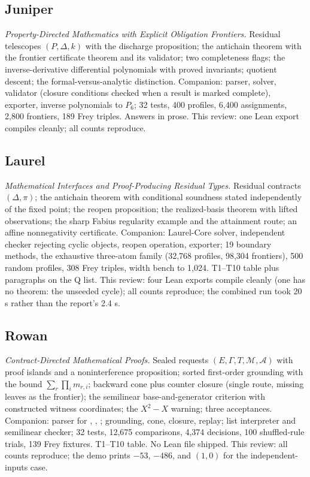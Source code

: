 \subsection*{Juniper}
\emph{Property-Directed Mathematics with Explicit Obligation Frontiers.} Residual telescopes $(P,\Delta,k)$ with the discharge proposition; the antichain theorem with the frontier certificate theorem and its validator; two completeness flags; the inverse-derivative differential polynomials with proved invariants; quotient descent; the formal-versus-analytic distinction. Companion: parser, solver, validator (closure conditions checked when a result is marked complete), exporter, inverse polynomials to $P_6$; 32 tests, 400 profiles, 6,400 assignments, 2,800 frontiers, 189 Frey triples. Answers in prose. This review: one Lean export compiles cleanly; all counts reproduce.

\subsection*{Laurel}
\emph{Mathematical Interfaces and Proof-Producing Residual Types.} Residual contracts $(\Delta,\pi)$; the antichain theorem with conditional soundness stated independently of the fixed point; the reopen proposition; the realized-basis theorem with lifted observations; the sharp Fabius regularity example and the attainment route; an affine nonnegativity certificate. Companion: Laurel-Core solver, independent checker rejecting cyclic objects, reopen operation, exporter; 19 boundary methods, the exhaustive three-atom family (32,768 profiles, 98,304 frontiers), 500 random profiles, 308 Frey triples, width bench to 1,024. T1--T10 table plus paragraphs on the Q list. This review: four Lean exports compile cleanly (one has no theorem: the unseeded cycle); all counts reproduce; the combined run took 20 s rather than the report's 2.4 s.

\subsection*{Rowan}
\emph{Contract-Directed Mathematical Proofs.} Sealed requests $(E,\Gamma,T,\mathcal M,\mathcal A)$ with proof islands and a noninterference proposition; sorted first-order grounding with the bound $\sum_r\prod_i m_{r,i}$; backward cone plus counter closure (single route, missing leaves as the frontier); the semilinear base-and-generator criterion with constructed witness coordinates; the $X^2-X$ warning; three acceptances. Companion: parser for , , ; grounding, cone, closure, replay; list interpreter and semilinear checker; 32 tests, 12,675 comparisons, 4,374 decisions, 100 shuffled-rule trials, 139 Frey fixtures. T1--T10 table. No Lean file shipped. This review: all counts reproduce; the demo prints $-53$, $-486$, and $(1,0)$ for the independent-inputs case.

